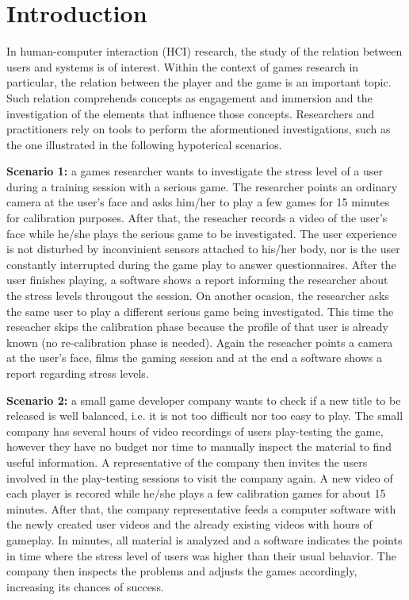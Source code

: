 \chapter{Introduction}
\label{c:introduction}

In human-computer interaction (HCI) research, the study of the relation between users and systems is of interest. Within the context of games research in particular, the relation between the player and the game is an important topic. Such relation comprehends concepts as engagement and immersion \parencite{boyle2012engagement} and the investigation of the elements that influence those concepts. Researchers and practitioners rely on tools to perform the aformentioned investigations, such as the one illustrated in the following hypoterical scenarios.

\textbf{Scenario 1:} a games researcher wants to investigate the stress level of a user during a training session with a serious game. The researcher points an ordinary camera at the user's face and asks him/her to play a few games for 15 minutes for calibration purposes. After that, the reseacher records a video of the user's face while he/she plays the serious game to be investigated. The user experience is not disturbed by inconvinient sensors attached to his/her body, nor is the user constantly interrupted during the game play to answer questionnaires. After the user finishes playing, a software shows a report informing the researcher about the stress levels througout the session. On another ocasion, the researcher asks the same user to play a different serious game being investigated. This time the reseacher skips the calibration phase because the profile of that user is already known (no re-calibration phase is needed). Again the reseacher points a camera at the user's face, films the gaming session and at the end a software shows a report regarding stress levels.

\textbf{Scenario 2:} a small game developer company wants to check if a new title to be released is well balanced, i.e. it is not too difficult nor too easy to play. The small company has several hours of video recordings of users play-testing the game, however they have no budget nor time to manually inspect the material to find useful information. A representative of the company then invites the users involved in the play-testing sessions to visit the company again. A new video of each player is recored while he/she plays a few calibration games for about 15 minutes. After that, the company representative feeds a computer software with the newly created user videos and the already existing videos with hours of gameplay. In minutes, all material is analyzed and a software indicates the points in time where the stress level of users was higher than their usual behavior. The company then inspects the problems and adjusts the games accordingly, increasing its chances of success.

